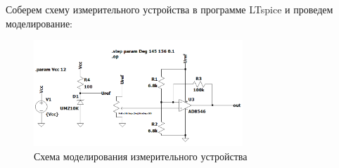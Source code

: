 Соберем схему измерительного устройства в программе LTspice и проведем моделирование:

\begin{figure}[!h]
    \centering
    \includegraphics[width=0.7\textwidth]{img/img_5}
    \caption{Схема моделирования измерительного устройства}
    \label{fig:img_5}
\end{figure}
\newpage
